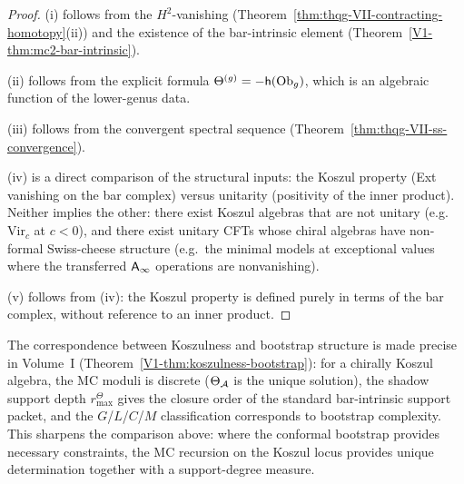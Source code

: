 \begin{proof}
(i) follows from the $H^2$-vanishing
(Theorem~\ref{thm:thqg-VII-contracting-homotopy}(ii))
and the existence of the bar-intrinsic element
(Theorem~\ref*{V1-thm:mc2-bar-intrinsic}).

(ii) follows from the explicit formula
$\Theta^{(g)} = -\mathsf{h}(\mathrm{Ob}_g)$, which is an algebraic
function of the lower-genus data.

(iii) follows from the convergent spectral sequence
(Theorem~\ref{thm:thqg-VII-ss-convergence}).

(iv) is a direct comparison of the structural inputs: the
Koszul property (Ext vanishing on the bar complex) versus
unitarity (positivity of the inner product). Neither
implies the other: there exist Koszul algebras that are not
unitary (e.g.\ $\mathrm{Vir}_c$ at $c < 0$), and there exist
unitary CFTs whose chiral algebras have non-formal Swiss-cheese
structure (e.g.\ the minimal models at exceptional values where the
transferred $\mathsf{A}_{\infty}$ operations are nonvanishing).

(v) follows from (iv): the Koszul property is defined purely
in terms of the bar complex, without reference to an inner
product.
\end{proof}

\begin{remark}
\label{rem:vol2-koszulness-bootstrap}
The correspondence between Koszulness and bootstrap structure
is made precise in Volume~I
\textup{(}Theorem~\textup{\ref*{V1-thm:koszulness-bootstrap})}: for
a chirally Koszul algebra, the MC moduli is discrete
\textup{(}$\Theta_{\mathcal{A}}$ is the unique solution\textup{)}, the shadow
support depth \(r^\Theta_{\max}\) gives the closure order of the
standard bar-intrinsic support packet, and the
$G$/$L$/$C$/$M$ classification corresponds to bootstrap complexity.
This sharpens the comparison above: where the conformal bootstrap
provides necessary constraints, the MC recursion on the Koszul locus
provides unique determination together with a support-degree measure.
\end{remark}

